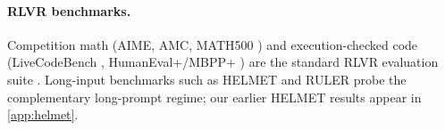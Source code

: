 \paragraph{RLVR benchmarks.}
Competition math (AIME, AMC, MATH500 \citep{lightman2023letsverify}) and
execution-checked code (LiveCodeBench \citep{jain2024livecodebench},
HumanEval+/MBPP+ \citep{liu2023evalplus}) are the standard RLVR evaluation
suite \citep{guo2025deepseekr1,yu2025dapo,luo2025deepscaler}. Long-input
benchmarks such as HELMET \citep{yen2025helmet} and RULER
\citep{hsieh2024ruler} probe the complementary long-prompt regime; our
earlier HELMET results appear in \cref{app:helmet}.
